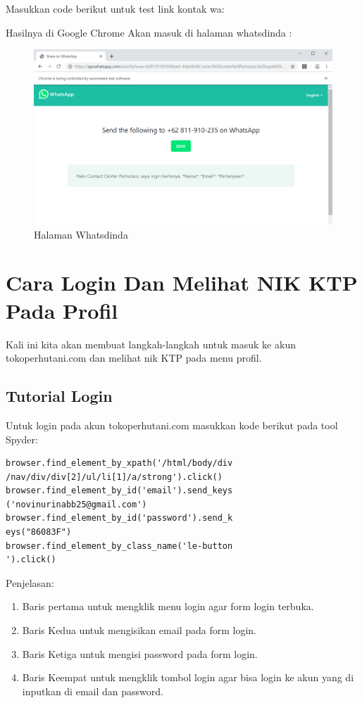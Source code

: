 Masukkan code berikut untuk test link kontak wa:



Hasilnya  di Google Chrome Akan masuk di halaman whatsdinda : 

\begin{figure}[h]
	\centering
	\includegraphics[scale=0.30]{figures/5linkwa}
	\caption{Halaman Whatsdinda}
\end{figure}

\newpage
\section{Cara Login Dan Melihat NIK KTP Pada Profil}
Kali ini kita akan membuat langkah-langkah untuk masuk ke akun tokoperhutani.com dan melihat nik KTP pada menu profil.  
\subsection{Tutorial Login}
Untuk login pada akun tokoperhutani.com masukkan kode berikut pada tool Spyder:
\begin{verbatim}
browser.find_element_by_xpath('/html/body/div
/nav/div/div[2]/ul/li[1]/a/strong').click()
browser.find_element_by_id('email').send_keys
('novinurinabb25@gmail.com')
browser.find_element_by_id('password').send_k
eys("86083F")
browser.find_element_by_class_name('le-button
').click()
\end{verbatim}

Penjelasan:
\begin{enumerate}
	\item Baris pertama untuk mengklik menu login agar form login terbuka.
	\item Baris Kedua untuk mengisikan email pada form login. 
	\item Baris Ketiga untuk mengisi password pada form login.
	\item Baris Keempat untuk mengklik tombol login agar bisa login ke akun yang di inputkan di email dan password.
\end{enumerate}

